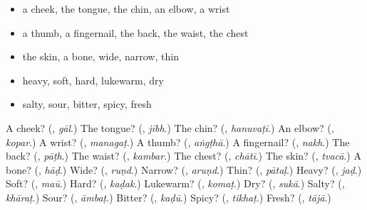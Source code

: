 \begin{itemize}
\raggedright
  \item a cheek, the tongue, the chin, an elbow, a wrist
  \item a thumb, a fingernail, the back, the waist, the chest
  \item the skin, a bone, wide, narrow, thin
  \item heavy, soft, hard, lukewarm, dry
  \item salty, sour, bitter, spicy, fresh
\end{itemize}

\begin{tcolorbox}[breakable,colback=teal!4,colframe=teal!35!black,title={Before you move on}]
A cheek? (\textbf{}, \emph{gāl}.) The tongue? (\textbf{}, \emph{jībh}.) The chin? (\textbf{}, \emph{hanuvaṭī}.) An elbow? (\textbf{}, \emph{kopar}.) A wrist? (\textbf{}, \emph{managaṭ}.) A thumb? (\textbf{}, \emph{aṅgṭhā}.) A fingernail? (\textbf{}, \emph{nakh}.) The back? (\textbf{}, \emph{pāṭh}.) The waist? (\textbf{}, \emph{kambar}.) The chest? (\textbf{}, \emph{chātī}.) The skin? (\textbf{}, \emph{tvacā}.) A bone? (\textbf{}, \emph{hāḍ}.) Wide? (\textbf{}, \emph{ruṇd}.) Narrow? (\textbf{}, \emph{aruṇd}.) Thin? (\textbf{}, \emph{pātaḷ}.) Heavy? (\textbf{}, \emph{jaḍ}.) Soft? (\textbf{}, \emph{maū}.) Hard? (\textbf{}, \emph{kaḍak}.) Lukewarm? (\textbf{}, \emph{komaṭ}.) Dry? (\textbf{}, \emph{sukā}.) Salty? (\textbf{}, \emph{khāraṭ}.) Sour? (\textbf{}, \emph{āmbaṭ}.) Bitter? (\textbf{}, \emph{kaḍū}.) Spicy? (\textbf{}, \emph{tikhaṭ}.) Fresh? (\textbf{}, \emph{tājā}.)
\end{tcolorbox}
